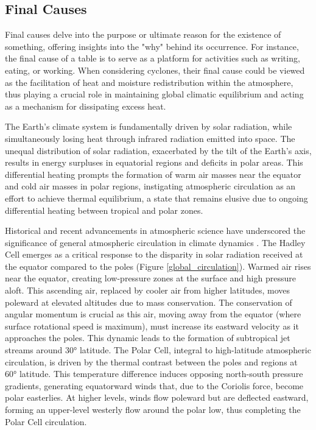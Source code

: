 \subsection{Final Causes}\label{final_causes}

Final causes delve into the purpose or ultimate reason for the existence of something, offering insights into the "why" behind its occurrence. For instance, the final cause of a table is to serve as a platform for activities such as writing, eating, or working. When considering cyclones, their final cause could be viewed as the facilitation of heat and moisture redistribution within the atmosphere, thus playing a crucial role in maintaining global climatic equilibrium and acting as a mechanism for dissipating excess heat.

The Earth's climate system is fundamentally driven by solar radiation, while simultaneously losing heat through infrared radiation emitted into space. The unequal distribution of solar radiation, exacerbated by the tilt of the Earth's axis, results in energy surpluses in equatorial regions and deficits in polar areas. This differential heating prompts the formation of warm air masses near the equator and cold air masses in polar regions, instigating atmospheric circulation as an effort to achieve thermal equilibrium, a state that remains elusive due to ongoing differential heating between tropical and polar zones.

Historical and recent advancements in atmospheric science have underscored the significance of general atmospheric circulation in climate dynamics \citep{lorenz1967nature, hadley1735vi, stull2015practical, schneider2006general}. The Hadley Cell emerges as a critical response to the disparity in solar radiation received at the equator compared to the poles (Figure \ref{global_circulation}). Warmed air rises near the equator, creating low-pressure zones at the surface and high pressure aloft. This ascending air, replaced by cooler air from higher latitudes, moves poleward at elevated altitudes due to mass conservation. The conservation of angular momentum is crucial as this air, moving away from the equator (where surface rotational speed is maximum), must increase its eastward velocity as it approaches the poles. This dynamic leads to the formation of subtropical jet streams around 30° latitude. The Polar Cell, integral to high-latitude atmospheric circulation, is driven by the thermal contrast between the poles and regions at 60° latitude. This temperature difference induces opposing north-south pressure gradients, generating equatorward winds that, due to the Coriolis force, become polar easterlies. At higher levels, winds flow poleward but are deflected eastward, forming an upper-level westerly flow around the polar low, thus completing the Polar Cell circulation.

